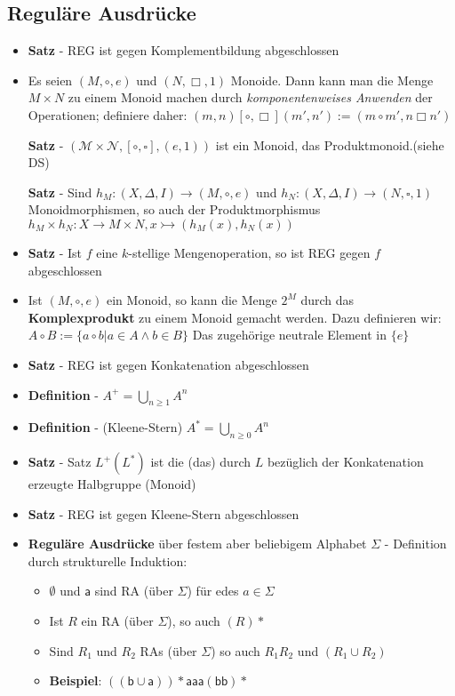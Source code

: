 \documentclass[12pt, a4paper]{article}
\begin{document}
	\subsection{Reguläre Ausdrücke}
	\begin{itemize}
		\item \textbf{Satz} - REG ist gegen Komplementbildung abgeschlossen
		
		\item Es seien $(M,\circ,e)$ und $(N,\Box,1)$ Monoide. Dann kann man die Menge $M\times N$ zu einem Monoid machen durch \textit{komponentenweises Anwenden} der Operationen; definiere daher: $(m,n)[\circ,\Box](m',n'):=(m\circ m',n\Box n')$
		
		\subitem \textbf{Satz} - $(\mathcal{M}\times\mathcal{N}, [\circ,\square ],(e,1))$ ist ein Monoid, das Produktmonoid.(siehe DS)
		
		\subitem \textbf{Satz} - Sind $h_{M}:(X,\Delta,I)\rightarrow(M,\circ,e)$ und $h_{N}:(X,\Delta,I)\rightarrow(N,\square,1)$ Monoidmorphismen, so auch der Produktmorphismus $h_{M}\times h_{N}:X\rightarrow M\times N, x\rightarrowtail(h_{M}(x),h_{N}(x))$
		
		\item \textbf{Satz} - Ist $f$ eine $k$-stellige Mengenoperation, so ist REG gegen $f$ abgeschlossen
		
		\item Ist $(M,\circ, e)$ ein Monoid, so kann die Menge $2^{M}$ durch das \textbf{Komplexprodukt} zu einem Monoid gemacht werden. Dazu definieren wir: $A\circ B:=\{a\circ b|a\in A \wedge b\in B\}$ Das zugehörige neutrale Element in $\{e\}$
		
		\item \textbf{Satz} - REG ist gegen Konkatenation abgeschlossen
		
		\item \textbf{Definition} - $A^{+}=\bigcup_{n\geq1}A^{n}$
		
		\item \textbf{Definition} - (Kleene-Stern) $A^{*}=\bigcup_{n\geq0}A^{n}$
		
		\item \textbf{Satz} - Satz $L^{+}(L^{*})$ ist die (das) durch $L$ bezüglich der Konkatenation erzeugte Halbgruppe (Monoid)
		
		\item \textbf{Satz} - REG ist gegen Kleene-Stern abgeschlossen
		
		\item \textbf{Reguläre Ausdrücke} über festem aber beliebigem Alphabet $\Sigma$ -
		Definition durch strukturelle Induktion:
		\begin{itemize}
			\item $\emptyset$ und $\mathsf{a}$ sind RA (über $\Sigma$) für edes $a\in\Sigma$
			\item Ist $R$ ein RA (über $\Sigma$), so auch $(R)*$
			\item Sind $R_{1}$ und $R_{2}$ RAs (über $\Sigma$) so auch $R_{1}R_{2}$ und $(R_{1}\cup R_{2})$
			\item \textbf{Beispiel}: $\mathsf{((b\cup a))*aaa(bb)*}$
		\end{itemize}
		

\end{itemize}
\end{document}
